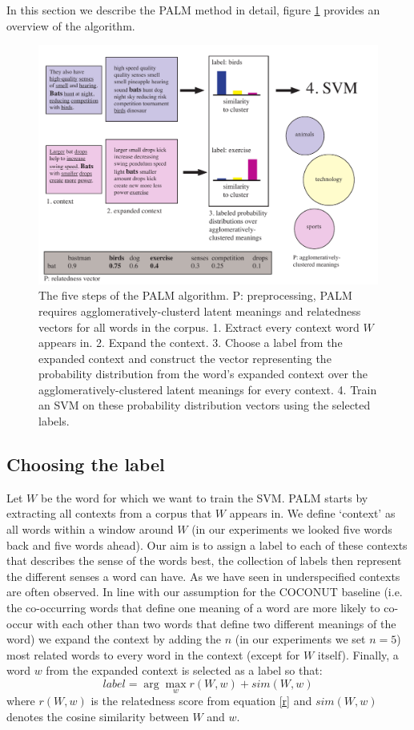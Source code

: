 \documentclass[11pt]{article}
\begin{document}
In this section we describe the PALM method in detail, figure \ref{palmimg} provides an overview of the algorithm. 
\begin{figure}
\center
\includegraphics[scale=0.6]{images/palm.pdf}
\caption{The five steps of the PALM algorithm. P: preprocessing, PALM requires agglomeratively-clusterd latent meanings and relatedness vectors for all words in the corpus. 1. Extract every context word $W$ appears in. 2. Expand the context. 3. Choose a label from the expanded context and construct the vector representing the probability distribution from the word's expanded context over the agglomeratively-clustered latent meanings for every context. 4. Train an SVM on these probability distribution vectors using the selected labels.}
\label{palmimg}
\end{figure}

\subsection{Choosing the label}
Let $W$ be the word for which we want to train the SVM. PALM starts by extracting all contexts from a corpus that $W$ appears in. We define `context' as all words within a window around $W$ (in our experiments we looked five words back and five words ahead). Our aim is to assign a label to each of these contexts that describes the sense of the words best, the collection of labels then represent the different senses a word can have. As we have seen in \cite{analysis} underspecified contexts are often observed. In line with our assumption for the COCONUT baseline (i.e. the co-occurring words that define one meaning of a word are more likely to co-occur with each other than two words that define two different meanings of the word) we expand the context by adding the $n$ (in our experiments we set $n=5$) most related words to every word in the context (except for $W$ itself). Finally, a word $w$ from the expanded context is selected as a label so that:
\begin{equation}\label{label}label = \arg\max_w r(W, w) + \textit{sim}(W, w)\end{equation}
where $r(W, w)$ is the relatedness score from equation \ref{r} and $\textit{sim}(W, w)$ denotes the cosine similarity between $W$ and $w$. 
\end{document}
